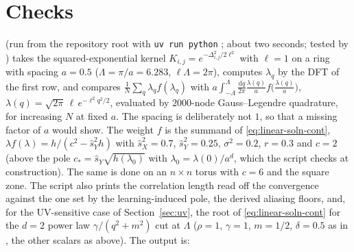 \documentclass[11pt,a4paper]{article}
\newcommand{\dd}{\mathrm d}
\newcommand{\Lam}{\Lambda}
\newcommand{\sX}{\hat s_X}
\newcommand{\sY}{\hat s_Y}
\begin{document}
\section{Checks}
\label{sec:checks}
 (run from the repository root with \texttt{uv run python} ; about two seconds; tested by ) takes the squared-exponential kernel $K_{i,j} = e^{-\Delta_{i,j}^2/2\ell^2}$ with $\ell = 1$ on a ring with spacing $a = 0.5$ ($\Lam = \pi/a = 6.283$, $\ell\Lam = 2\pi$), computes $\lambda_q$ by the DFT of the first row, and compares $\frac1N\sum_q\lambda_qf(\lambda_q)$ with $a\int_{-\Lam}^{\Lam}\frac{\dd q}{2\pi}\frac{\lambda(q)}{a}f\big(\frac{\lambda(q)}{a}\big)$, $\lambda(q) = \sqrt{2\pi}\,\ell\,e^{-\ell^2q^2/2}$, evaluated by $2000$-node Gauss--Legendre quadrature, for increasing $N$ at fixed $a$. The spacing is deliberately not $1$, so that a missing factor of $a$ would show. The weight $f$ is the summand of \eqref{eq:linear-soln-cont}, $\lambda f(\lambda) = h/(c^2-\sY^2h)$ with $\sX^2 = 0.7$, $\sY^2 = 0.25$, $\sigma^2 = 0.2$, $r = 0.3$ and $c = 2$ (above the pole $c_* = \sY\sqrt{h(\lambda_0)}$ with $\lambda_0 = \lambda(0)/a^d$, which the script checks at construction). The same is done on an $n\times n$ torus with $c = 6$ and the square zone. The script also prints the correlation length read off the convergence against the one set by the learning-induced pole, the derived aliasing floors, and, for the UV-sensitive case of Section~\ref{sec:uv}, the root of \eqref{eq:linear-soln-cont} for the $d=2$ power law $\gamma/(q^2+m^2)$ cut at $\Lam$ ($\rho = 1$, $\gamma = 1$, $m = 1/2$, $\delta = 0.5$ as in , the other scalars as above). The output is:
\end{document}
